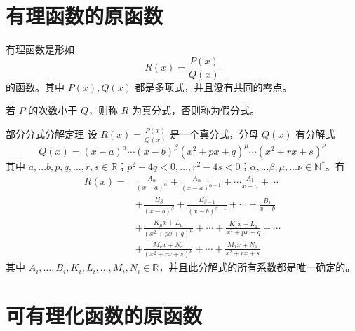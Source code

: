 
\section{有理函数的原函数}

\begin{definition}
    有理函数是形如
    \[R(x) = \frac{P(x)}{Q(x)}\]
    的函数。其中 $P(x),Q(x)$ 都是多项式，并且没有共同的零点。

    若 $P$ 的次数小于 $Q$，则称 $R$ 为真分式，否则称为假分式。
\end{definition}

\begin{theorem}{部分分式分解定理}
    设 $R(x) = \frac{P(x)}{Q(x)}$ 是一个真分式，分母 $Q(x)$ 有分解式
    \[Q(x) = (x - a)^\alpha \cdots (x - b)^\beta(x^2 + px + q)^\mu \cdots (x^2 + rx + s)^\nu\]
    其中 $a, \ldots b,p,q, \ldots ,r,s \in \mathbb{R}$；$p^2 - 4q < 0, \ldots ,r^2 - 4s < 0$；$\alpha, \ldots \beta,\mu, \ldots \nu \in \mathbb{N}^*$。有
    \begin{align*}
        R(x) = & \frac{A_\alpha}{(x - a)^\alpha} + \frac{A_{\alpha - 1}}{(x - a)^{\alpha - 1}} + \cdots \frac{A_1}{x - a} + \cdots \\
               & + \frac{B_\beta}{(x - b)^\beta} + \frac{B_{\beta - 1}}{(x - b)^{\beta - 1}} + \cdots + \frac{B_1}{x - b}          \\
               & + \frac{K_{\mu}x + L_\mu}{(x^2 + px + q)^\mu} + \cdots + \frac{K_{1}x + L_1}{x^2 + px + q} + \cdots               \\
               & + \frac{M_{\nu}x + N_\nu}{(x^2 + rx + s)^\nu} + \cdots + \frac{M_{1}x + N_1}{x^2 + rx + s}
    \end{align*}
    其中 $A_i, \ldots ,B_i,K_i,L_i, \ldots ,M_i,N_i \in \mathbb{R}$，并且此分解式的所有系数都是唯一确定的。
\end{theorem}


\section{可有理化函数的原函数}

